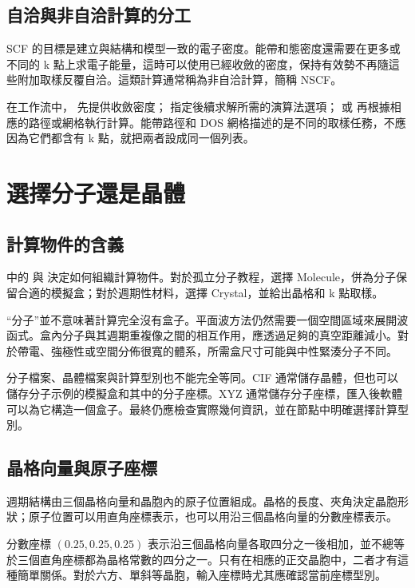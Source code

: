 \subsection{自洽與非自洽計算的分工}

SCF 的目標是建立與結構和模型一致的電子密度。能帶和態密度還需要在更多或不同的 k 點上求電子能量，這時可以使用已經收斂的密度，保持有效勢不再隨這些附加取樣反覆自洽。這類計算通常稱為非自洽計算，簡稱 NSCF。

在工作流中， 先提供收斂密度； 指定後續求解所需的演算法選項； 或  再根據相應的路徑或網格執行計算。能帶路徑和 DOS 網格描述的是不同的取樣任務，不應因為它們都含有 k 點，就把兩者設成同一個列表。

\section{選擇分子還是晶體}

\subsection{計算物件的含義}

 中的  與  決定如何組織計算物件。對於孤立分子教程，選擇 Molecule，併為分子保留合適的模擬盒；對於週期性材料，選擇 Crystal，並給出晶格和 k 點取樣。

“分子”並不意味著計算完全沒有盒子。平面波方法仍然需要一個空間區域來展開波函式。盒內分子與其週期重複像之間的相互作用，應透過足夠的真空距離減小。對於帶電、強極性或空間分佈很寬的體系，所需盒尺寸可能與中性緊湊分子不同。

分子檔案、晶體檔案與計算型別也不能完全等同。CIF 通常儲存晶體，但也可以儲存分子示例的模擬盒和其中的分子座標。XYZ 通常儲存分子座標，匯入後軟體可以為它構造一個盒子。最終仍應檢查實際幾何資訊，並在節點中明確選擇計算型別。

\subsection{晶格向量與原子座標}

週期結構由三個晶格向量和晶胞內的原子位置組成。晶格的長度、夾角決定晶胞形狀；原子位置可以用直角座標表示，也可以用沿三個晶格向量的分數座標表示。

分數座標 $(0.25,0.25,0.25)$ 表示沿三個晶格向量各取四分之一後相加，並不總等於三個直角座標都為晶格常數的四分之一。只有在相應的正交晶胞中，二者才有這種簡單關係。對於六方、單斜等晶胞，輸入座標時尤其應確認當前座標型別。


